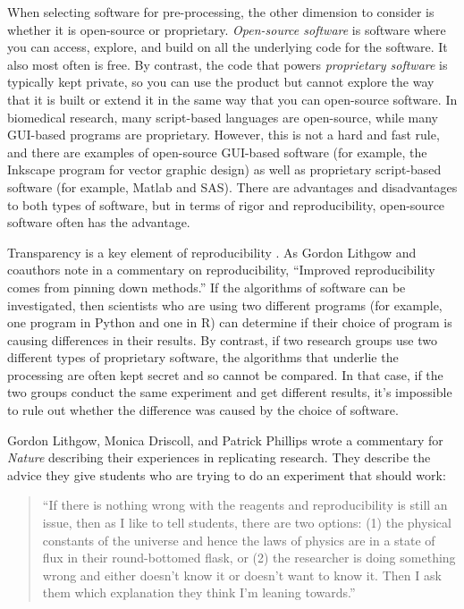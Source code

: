 \documentclass[]{tufte-book}
\begin{document}
When selecting software for pre-processing, the other dimension to consider is
whether it is open-source or proprietary. \emph{Open-source software} is software
where you can access, explore, and build on all the underlying code for the
software. It also most often is free. By contrast, the code that powers
\emph{proprietary software} is typically kept private, so you can use the product but
cannot explore the way that it is built or extend it in the same way that you
can open-source software. In biomedical research, many script-based languages
are open-source, while many GUI-based programs are proprietary. However, this is
not a hard and fast rule, and there are examples of open-source GUI-based
software (for example, the Inkscape program for vector graphic design) as well
as proprietary script-based software (for example, Matlab and SAS). There are
advantages and disadvantages to both types of software, but in terms of rigor
and reproducibility, open-source software often has the advantage.

Transparency is a key element of reproducibility \citep{neff2021past}. As Gordon
Lithgow and coauthors note in a commentary on reproducibility, ``Improved
reproducibility comes from pinning down methods.'' \citep{lithgow2017long} If the
algorithms of software can be investigated, then scientists who are using two
different programs (for example, one program in Python and one in R) can
determine if their choice of program is causing differences in their results. By
contrast, if two research groups use two different types of proprietary
software, the algorithms that underlie the processing are often kept secret and
so cannot be compared. In that case, if the two groups conduct the same
experiment and get different results, it's impossible to rule out whether the
difference was caused by the choice of software.

Gordon Lithgow, Monica Driscoll, and Patrick Phillips wrote a commentary for
\emph{Nature} describing their experiences in replicating research. They
describe the advice they give students who are trying to do an
experiment that should work:

\begin{quote}
``If there is nothing wrong with the reagents and reproducibility is still an
issue, then as I like to tell students, there are two options: (1) the physical
constants of the universe and hence the laws of physics are in a state of flux
in their round-bottomed flask, or (2) the researcher is doing something wrong
and either doesn't know it or doesn't want to know it. Then I ask them which
explanation they think I'm leaning towards.'' \citep{gibb2014reproducibility}
\end{quote}
\end{document}
